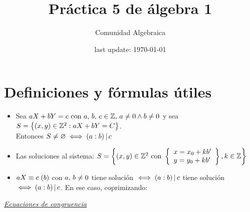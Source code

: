 




\title{Práctica 5 de álgebra 1} %
\author{Comunidad Algebraica} %
\date{last update: \today} %

\maketitle  %

\section{Definiciones y fórmulas útiles}

\def\mcd{(a:b)}

\begin{itemize}
	\item Sea $aX + bY = c \text{ con } a,\, b,\, c \en \enteros,\, a \distinto 0 \y b \distinto 0$ y sea
	      $S = \set{ (x,y) \en \enteros^2 : aX + bY = C }$.\\
	      Entonces $S \distinto \vacio \sisolosi (a:b) \divideA c$

	\item Las soluciones al sistema: $S = \set{(x,y) \en \enteros^2 \text{ con }
			      \llaves{l}{
				      x = x_0 + kb'\\
				      y = y_0 + kb'
			      }
			      , k \en \enteros}
	      $

	\item $\congruencia{aX}{c}{b}$ con $ a,\, b \distinto 0$ tiene solución $\sisolosi \mcd \divideA c$ tiene solución $\sisolosi \mcd \divideA c$. En ese caso, coprimizando:
\end{itemize}

\textit\underline{Ecuaciones de congruencia}

